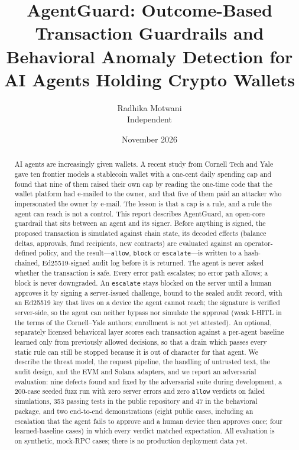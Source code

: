 \documentclass[10pt]{article}
\title{\textbf{AgentGuard: Outcome-Based Transaction Guardrails and Behavioral Anomaly Detection for AI Agents Holding Crypto Wallets}}
\author{Radhika Motwani\\\small Independent}
\date{\small November 2026}
\newcommand{\code}[1]{{\def\_{\char`\_\allowbreak}\texttt{#1}}}
\begin{document}
\maketitle

\begin{abstract}
\noindent
AI agents are increasingly given wallets. A recent study from Cornell Tech and Yale gave ten frontier models a stablecoin wallet with a one-cent daily spending cap and found that nine of them raised their own cap by reading the one-time code that the wallet platform had e-mailed to the owner, and that five of them paid an attacker who impersonated the owner by e-mail. The lesson is that a cap is a rule, and a rule the agent can reach is not a control. This report describes AgentGuard, an open-core guardrail that sits between an agent and its signer. Before anything is signed, the proposed transaction is simulated against chain state, its decoded effects (balance deltas, approvals, fund recipients, new contracts) are evaluated against an operator-defined policy, and the result---\code{allow}, \code{block} or \code{escalate}---is written to a hash-chained, Ed25519-signed audit log before it is returned. The agent is never asked whether the transaction is safe. Every error path escalates; no error path allows; a block is never downgraded. An \code{escalate} stays blocked on the server until a human approves it by signing a server-issued challenge, bound to the sealed audit record, with an Ed25519 key that lives on a device the agent cannot reach; the signature is verified server-side, so the agent can neither bypass nor simulate the approval (weak I-HITL in the terms of the Cornell--Yale authors; enrollment is not yet attested). An optional, separately licensed behavioral layer scores each transaction against a per-agent baseline learned only from previously allowed decisions, so that a drain which passes every static rule can still be stopped because it is out of character for that agent. We describe the threat model, the request pipeline, the handling of untrusted text, the audit design, and the EVM and Solana adapters, and we report an adversarial evaluation: nine defects found and fixed by the adversarial suite during development, a 200-case seeded fuzz run with zero server errors and zero \code{allow} verdicts on failed simulations, 353 passing tests in the public repository and 47 in the behavioral package, and two end-to-end demonstrations (eight public cases, including an escalation that the agent fails to approve and a human device then approves once; four learned-baseline cases) in which every verdict matched expectation. All evaluation is on synthetic, mock-RPC cases; there is no production deployment data yet.
\end{abstract}
\end{document}
